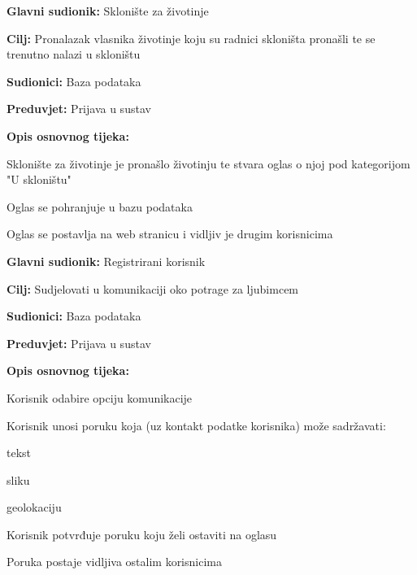 					\noindent {}
					\begin{packed_item}
	
						\item \textbf{Glavni sudionik:} Sklonište za životinje
						\item  \textbf{Cilj:} Pronalazak vlasnika životinje koju su radnici skloništa pronašli te se trenutno nalazi u skloništu
						\item  \textbf{Sudionici:} Baza podataka
						\item  \textbf{Preduvjet:} Prijava u sustav
						\item  \textbf{Opis osnovnog tijeka:}
						
						\item[] \begin{packed_enum}
	
							\item Sklonište za životinje je pronašlo životinju te stvara oglas o njoj pod kategorijom "U skloništu"
							\item Oglas se pohranjuje u bazu podataka
							\item Oglas se postavlja na web stranicu i vidljiv je drugim korisnicima
						\end{packed_enum}
					\end{packed_item}
					
					
					
					\noindent \underbar{\textbf{UC11 - Komunikacija}}
					\begin{packed_item}
	
						\item \textbf{Glavni sudionik:} Registrirani korisnik
						\item  \textbf{Cilj:} Sudjelovati u komunikaciji oko potrage za ljubimcem
						\item  \textbf{Sudionici:} Baza podataka
						\item  \textbf{Preduvjet:} Prijava u sustav
						\item  \textbf{Opis osnovnog tijeka:}
						
						\item[] \begin{packed_enum}
	
							\item Korisnik odabire opciju komunikacije
							\item Korisnik unosi poruku koja (uz kontakt podatke korisnika) može sadržavati:
								\item[] \begin{packed_enum}
									\item tekst
									\item sliku
									\item geolokaciju
								\end{packed_enum}
							\item Korisnik potvrđuje poruku koju želi ostaviti na oglasu
							\item Poruka postaje vidljiva ostalim korisnicima
						\end{packed_enum}
					\end{packed_item}
					
